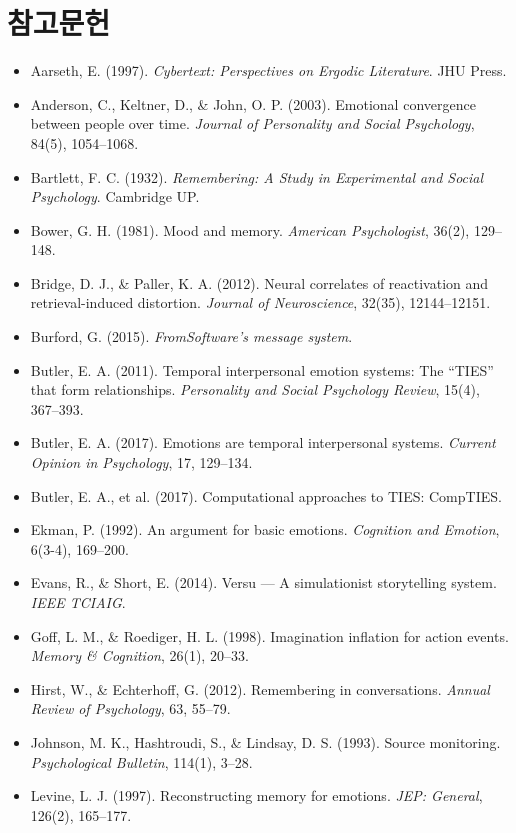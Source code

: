 \documentclass[11pt, a4paper]{article}
\begin{document}
\section*{참고문헌}
\small
\begin{itemize}
  \item Aarseth, E. (1997). \textit{Cybertext: Perspectives on Ergodic Literature}. JHU Press.
  \item Anderson, C., Keltner, D., \& John, O. P. (2003). Emotional convergence between people over time. \textit{Journal of Personality and Social Psychology}, 84(5), 1054--1068.
  \item Bartlett, F. C. (1932). \textit{Remembering: A Study in Experimental and Social Psychology}. Cambridge UP.
  \item Bower, G. H. (1981). Mood and memory. \textit{American Psychologist}, 36(2), 129--148.
  \item Bridge, D. J., \& Paller, K. A. (2012). Neural correlates of reactivation and retrieval-induced distortion. \textit{Journal of Neuroscience}, 32(35), 12144--12151.
  \item Burford, G. (2015). \textit{FromSoftware's message system}.
  \item Butler, E. A. (2011). Temporal interpersonal emotion systems: The ``TIES'' that form relationships. \textit{Personality and Social Psychology Review}, 15(4), 367--393.
  \item Butler, E. A. (2017). Emotions are temporal interpersonal systems. \textit{Current Opinion in Psychology}, 17, 129--134.
  \item Butler, E. A., et al. (2017). Computational approaches to TIES: CompTIES.
  \item Ekman, P. (1992). An argument for basic emotions. \textit{Cognition and Emotion}, 6(3-4), 169--200.
  \item Evans, R., \& Short, E. (2014). Versu --- A simulationist storytelling system. \textit{IEEE TCIAIG}.
  \item Goff, L. M., \& Roediger, H. L. (1998). Imagination inflation for action events. \textit{Memory \& Cognition}, 26(1), 20--33.
  \item Hirst, W., \& Echterhoff, G. (2012). Remembering in conversations. \textit{Annual Review of Psychology}, 63, 55--79.
  \item Johnson, M. K., Hashtroudi, S., \& Lindsay, D. S. (1993). Source monitoring. \textit{Psychological Bulletin}, 114(1), 3--28.
  \item Levine, L. J. (1997). Reconstructing memory for emotions. \textit{JEP: General}, 126(2), 165--177.

\end{itemize}
\end{document}
